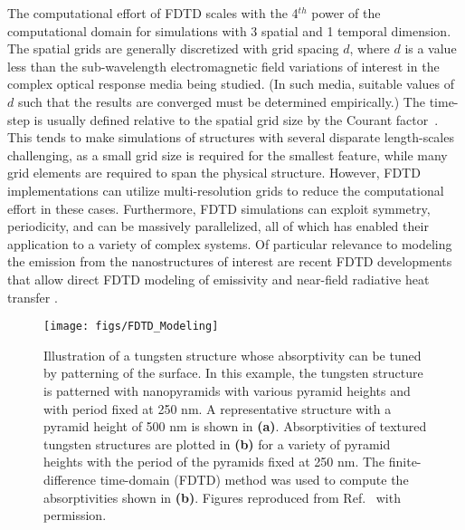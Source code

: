 \documentclass[10pt,letterpaper]{article}
\begin{document}
{The computational effort of FDTD scales with the 4$^{th}$ power of the computational domain for 
simulations with 3 spatial and 1 temporal dimension.
The spatial grids are generally discretized with grid spacing $d$, where $d$ is a value less
than the sub-wavelength electromagnetic field variations of interest in the complex
optical response media being studied. (In such media, suitable values of $d$ 
such that the results are converged must
be determined empirically.)
The time-step is usually defined relative to the spatial grid size by the Courant 
factor~\cite{Taflove_FDTD}.   This tends to make simulations of structures with several disparate length-scales challenging, as a small
grid size is required for the smallest feature, while many grid elements are required to span the physical structure.  However, FDTD 
implementations can utilize multi-resolution grids to reduce the computational effort in these cases.  Furthermore, FDTD simulations 
can exploit symmetry, periodicity, and can be massively parallelized, all of which has enabled their application to a variety of complex systems.
Of particular relevance to modeling the emission from the nanostructures of interest are recent
FDTD developments that allow direct FDTD modeling of emissivity and near-field radiative heat transfer
\cite{rodriguez2011,datas2013,didari2014,didari2015}.


\begin{figure}[h]
        \texttt{[image: figs/FDTD\_Modeling]}
        \caption{\label{FDTD_Structures}  Illustration of a tungsten structure whose
absorptivity can be tuned by patterning of the surface.  In this example, the tungsten
structure is patterned with nanopyramids with various pyramid heights and with period fixed
at  250 nm.  A representative structure with a pyramid height of 500 nm is shown in {\bf (a)}.
Absorptivities of textured tungsten structures
are plotted in {\bf (b)} for a variety of pyramid heights with the period of the pyramids
fixed at 250 nm.  The finite-difference time-domain (FDTD) method
was used to compute the absorptivities shown in {\bf (b)}.  
Figures reproduced from Ref.~\cite{RF_OptExp_2009} with permission.}
\end{figure}


}
\end{document}

